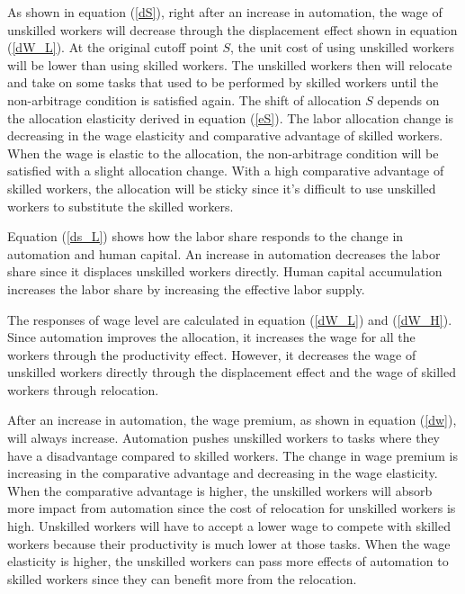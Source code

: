 \documentclass[12pt]{article}
\begin{document}
As shown in equation (\ref{dS}), right after an increase in automation, the wage of unskilled workers will decrease through the displacement effect shown in equation  (\ref{dW_L}). At the original cutoff point $S$, the unit cost of using unskilled workers will be lower than using skilled workers. The unskilled workers then will relocate and take on some tasks that used to be performed by skilled workers until the non-arbitrage condition is satisfied again. The shift of allocation $S$ depends on the allocation elasticity derived in equation (\ref{eS}). The labor allocation change is decreasing in the wage elasticity and comparative advantage of skilled workers. When the wage is elastic to the allocation, the non-arbitrage condition will be satisfied with a slight allocation change. With a high comparative advantage of skilled workers, the allocation will be sticky since it's difficult to use unskilled workers to substitute the skilled workers. 

Equation (\ref{ds_L}) shows how the labor share responds to the change in automation and human capital. An increase in automation decreases the labor share since it displaces unskilled workers directly. Human capital accumulation increases the labor share by increasing the effective labor supply. 

The responses of wage level are calculated in equation (\ref{dW_L}) and (\ref{dW_H}). Since automation improves the allocation, it increases the wage for all the workers through the productivity effect. However, it decreases the wage of unskilled workers directly through the displacement effect and the wage of skilled workers through relocation. 

After an increase in automation, the wage premium, as shown in equation (\ref{dw}), will always increase. Automation pushes unskilled workers to tasks where they have a disadvantage compared to skilled workers. The change in wage premium is increasing in the comparative advantage and decreasing in the wage elasticity. When the comparative advantage is higher, the unskilled workers will absorb more impact from automation since the cost of relocation for unskilled workers is high. Unskilled workers will have to accept a lower wage to compete with skilled workers because their productivity is much lower at those tasks. When the wage elasticity is higher, the unskilled workers can pass more effects of automation to skilled workers since they can benefit more from the relocation.
\end{document}

